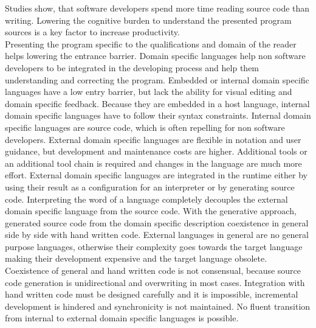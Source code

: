Studies show, that software developers spend more time reading source code than writing. Lowering the cognitive burden to understand the presented program sources is a key factor to increase productivity. \\
Presenting the program specific to the qualifications and domain of the reader helps lowering the entrance barrier. Domain specific languages help non software developers to be integrated in the developing process and help them understanding and correcting the program. Embedded or internal domain specific languages have a low entry barrier, but lack the ability for visual editing and domain specific feedback. Because they are embedded in a host language, internal domain specific languages have to follow their syntax constraints. Internal domain specific languages are source code, which is often repelling for non software developers. External domain specific languages are flexible in notation and user guidance, but development and maintenance costs are higher. Additional tools or an additional tool chain is required and changes in the language are much more effort. External domain specific languages are integrated in the runtime either by using their result as a configuration for an interpreter or by generating source code. Interpreting the word of a language completely decouples the external domain specific language from the source code. With the generative approach, generated source code from the domain specific description coexistence in general side by side with hand written code. External languages in general are no general purpose languages, otherwise their complexity goes towards the target language making their development expensive and the target language obsolete. Coexistence of general and hand written code is not consensual, because source code generation is unidirectional and overwriting in most cases. Integration with hand written code must be designed carefully and it is impossible, incremental development is hindered and synchronicity is not maintained. No fluent transition from internal to external domain specific languages is possible.   

